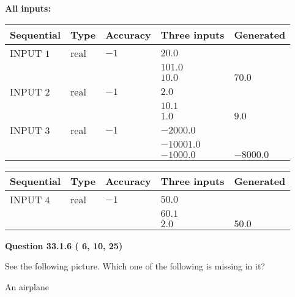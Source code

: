 \documentclass[12pt]{article}
\begin{document}
   
   
   
\noindent\vspace{0.1in}\hspace{-0.08in} {\textbf{\Large{All inputs: }}}
   
   
  
  
\noindent\begin{tabular}{|l|l|l|l|l|}
\hline
 Sequential & Type & Accuracy & Three inputs & Generated \\ 
\hline
 
 
  INPUT $           1$ & real & $          -1 $ & $
 20.0
  $ & \\
  & & &  $
 101.0
  $ & \\
  & & &  $
 10.0
 $ & $ 70.0 $ 
 \\  \hline  
 
 
  INPUT $           2$ & real & $          -1 $ & $
 2.0
  $ & \\
  & & &  $
 10.1
  $ & \\
  & & &  $
 1.0
 $ & $ 9.0 $ 
 \\  \hline  
 
 
  INPUT $           3$ & real & $          -1 $ & $
 -2000.0
  $ & \\
  & & &  $
 -10001.0
  $ & \\
  & & &  $
 -1000.0
 $ & $ -8000.0 $ 
 \\  \hline  
 \end{tabular}
   
   
  
  
\noindent\begin{tabular}{|l|l|l|l|l|}
\hline
 Sequential & Type & Accuracy & Three inputs & Generated \\ 
\hline
 
 
  INPUT $           4$ & real & $          -1 $ & $
 50.0
  $ & \\
  & & &  $
 60.1
  $ & \\
  & & &  $
 2.0
 $ & $ 50.0 $ 
 \\  \hline  
 \end{tabular}
   
   
  
\vspace{0.2in}
  
{\textbf{\Large{Question
33.1.6 
 (          6,         10,         25)
}}}
  
  
See the following picture.
Which one of the following is missing in it?
 
 
An airplane
 
\end{document}
